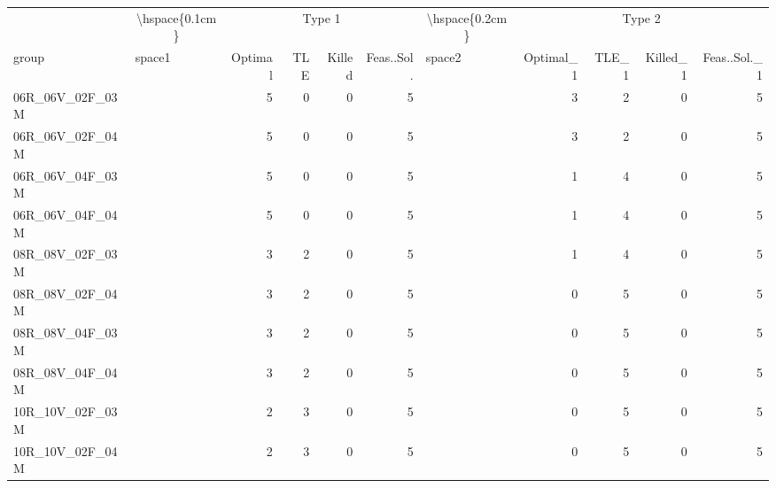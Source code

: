 
\begin{tabular}{llrrrrlrrrr}
\toprule
\multicolumn{1}{c}{} & \multicolumn{1}{c}{\textbackslash{}hspace\{0.1cm\}} & \multicolumn{4}{c}{Type 1} & \multicolumn{1}{c}{\textbackslash{}hspace\{0.2cm\}} & \multicolumn{4}{c}{Type 2} \\
\cmidrule(l{3pt}r{3pt}){2-2} \cmidrule(l{3pt}r{3pt}){3-6} \cmidrule(l{3pt}r{3pt}){7-7} \cmidrule(l{3pt}r{3pt}){8-11}
group & space1 & Optimal & TLE & Killed & Feas..Sol. & space2 & Optimal\_1 & TLE\_1 & Killed\_1 & Feas..Sol.\_1\\
\midrule
06R\_06V\_02F\_03M & \hspace{0.1cm} & 5 & 0 & 0 & 5 & \hspace{0.2cm} & 3 & 2 & 0 & 5\\
06R\_06V\_02F\_04M & \hspace{0.1cm} & 5 & 0 & 0 & 5 & \hspace{0.2cm} & 3 & 2 & 0 & 5\\
06R\_06V\_04F\_03M & \hspace{0.1cm} & 5 & 0 & 0 & 5 & \hspace{0.2cm} & 1 & 4 & 0 & 5\\
06R\_06V\_04F\_04M & \hspace{0.1cm} & 5 & 0 & 0 & 5 & \hspace{0.2cm} & 1 & 4 & 0 & 5\\
\addlinespace
08R\_08V\_02F\_03M & \hspace{0.1cm} & 3 & 2 & 0 & 5 & \hspace{0.2cm} & 1 & 4 & 0 & 5\\
08R\_08V\_02F\_04M & \hspace{0.1cm} & 3 & 2 & 0 & 5 & \hspace{0.2cm} & 0 & 5 & 0 & 5\\
08R\_08V\_04F\_03M & \hspace{0.1cm} & 3 & 2 & 0 & 5 & \hspace{0.2cm} & 0 & 5 & 0 & 5\\
08R\_08V\_04F\_04M & \hspace{0.1cm} & 3 & 2 & 0 & 5 & \hspace{0.2cm} & 0 & 5 & 0 & 5\\
\addlinespace
10R\_10V\_02F\_03M & \hspace{0.1cm} & 2 & 3 & 0 & 5 & \hspace{0.2cm} & 0 & 5 & 0 & 5\\
10R\_10V\_02F\_04M & \hspace{0.1cm} & 2 & 3 & 0 & 5 & \hspace{0.2cm} & 0 & 5 & 0 & 5\\

\end{tabular}
